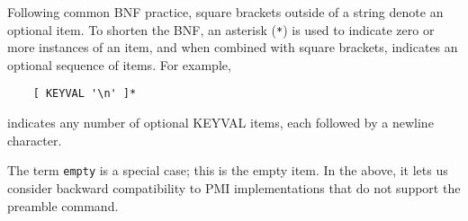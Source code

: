 \documentclass{article}
\begin{document}
Following common BNF practice, square brackets outside of a string
denote an optional item.  To shorten the BNF, an asterisk (\texttt{*})
is used to indicate zero or more instances of an item, and when
combined with square brackets, indicates an optional sequence of
items.  For example, 
\begin{verbatim}
    [ KEYVAL '\n' ]*
\end{verbatim}
indicates any number of optional KEYVAL items, each followed by a
newline character.

The term \texttt{empty} is a special case; this is the empty item.  In
the above, it lets us consider backward compatibility to PMI
implementations that do not support the preamble command.
\end{document}
